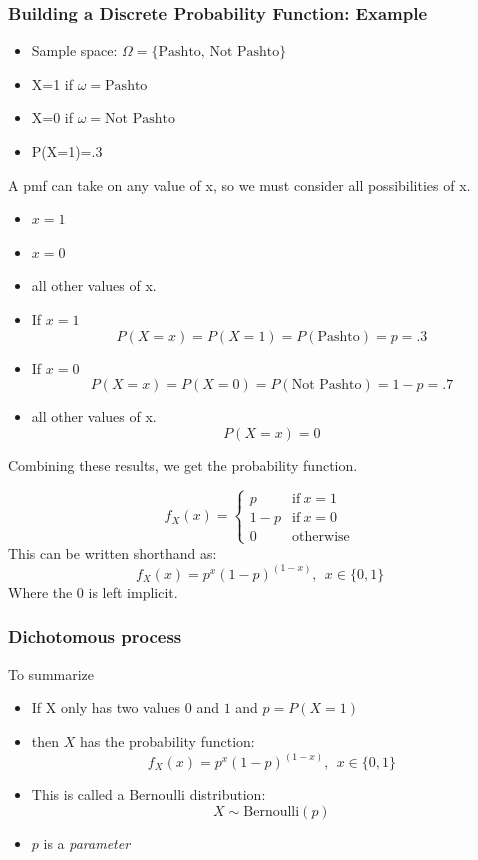 \documentclass[handout]{beamer}
\numberwithin{equation}{section}
\begin{document}
\begin{frame}
\frametitle{Building a Discrete Probability Function: Example}
\begin{itemize}
\item Sample space: $\Omega= \{\text{Pashto, Not Pashto}\}$
\item X=1 if $\omega=\text{Pashto}$
\item X=0 if $\omega=\text{Not Pashto}$ 
\item P(X=1)=.3
\end{itemize}
A pmf can take on any value of x, so we must consider all possibilities of x.
\begin{itemize}
\item $x = 1$
\item $x = 0$
\item all other values of x.
\end{itemize}
\end{frame}


\begin{frame}
\begin{itemize}
\item If $x = 1$
$$P(X=x)=P(X=1)=P(\text{Pashto})=p=.3$$\pause
\item If $x = 0$
$$P(X=x)=P(X=0)=P(\text{Not Pashto})=1-p=.7$$\pause
\item all other values of x.
$$P(X=x)=0$$
\end{itemize}\pause
Combining these results, we get the probability function.

$$f_X(x)=\begin{cases}
p & \text{if}\ x=1\\
1-p & \text{if}\ x=0\\
0 & \text{otherwise}
\end{cases}$$\pause
This can be written shorthand as:
$$f_X(x)=p^x(1-p)^{(1-x)},\ \ x\in \{0,1\}$$ 
Where the 0 is left implicit.

\end{frame}



\begin{frame}
\frametitle{Dichotomous process}

To summarize
\begin{itemize}
\item If X only has two values $0$ and $1$ and $p=P(X=1)$
\item[] then $X$ has the probability function:
$$f_X(x)=p^x(1-p)^{(1-x)},\ \ x\in \{0,1\}$$
\pause
\item This is called a Bernoulli distribution:
$$X\sim \text{Bernoulli}(p)$$
\item $p$ is a \emph{parameter}
\end{itemize}
\end{frame}
\end{document}
